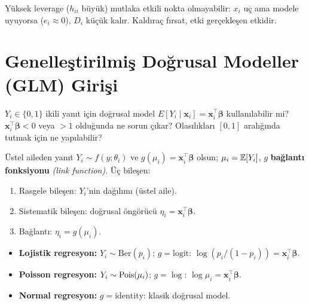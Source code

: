 \begin{ornek}\label{ex:leverage_etki}
Yüksek leverage ($h_{ii}$ büyük) mutlaka etkili nokta olmayabilir: $x_i$ uç ama modele uyuyorsa ($e_i\approx0$), $D_i$ küçük kalır. Kaldıraç fırsat, etki gerçekleşen etkidir.
\end{ornek}

\section{Genelleştirilmiş Doğrusal Modeller (GLM) Girişi}
\label{sec:glm}

\begin{kesif}
$Y_i \in \{0,1\}$ ikili yanıt için doğrusal model
$E[Y_i \mid \mathbf{x}_i] = \mathbf{x}_i^\top\boldsymbol\beta$ kullanılabilir mi?
$\mathbf{x}_i^\top\boldsymbol\beta < 0$ veya $> 1$ olduğunda ne sorun çıkar?
Olasılıkları $[0,1]$ aralığında tutmak için ne yapılabilir?
\end{kesif}

\begin{tanim}[GLM]\label{def:glm}
Üstel aileden yanıt $Y_i\sim f(y;\theta_i)$ ve $g(\mu_i)=\mathbf{x}_i^\top\boldsymbol\beta$ olsun; $\mu_i=\mathbb{E}[Y_i]$, $g$ \textbf{bağlantı fonksiyonu} \emph{(link function)}. Üç bileşen:
\begin{enumerate}
  \item Rasgele bileşen: $Y_i$'nin dağılımı (üstel aile).
  \item Sistematik bileşen: doğrusal öngörücü $\eta_i=\mathbf{x}_i^\top\boldsymbol\beta$.
  \item Bağlantı: $\eta_i=g(\mu_i)$.
\end{enumerate}
\end{tanim}

\begin{ornek}\label{ex:glm_ornekler}
\begin{itemize}
  \item \textbf{Lojistik regresyon:} $Y_i\sim\mathrm{Ber}(p_i)$; $g=\mathrm{logit}$: $\log(p_i/(1-p_i))=\mathbf{x}_i^\top\boldsymbol\beta$.
  \item \textbf{Poisson regresyon:} $Y_i\sim\operatorname{Pois}(\mu_i)$; $g=\log$: $\log\mu_i=\mathbf{x}_i^\top\boldsymbol\beta$.
  \item \textbf{Normal regresyon:} $g=\mathrm{identity}$: klasik doğrusal model.
\end{itemize}
\end{ornek}

